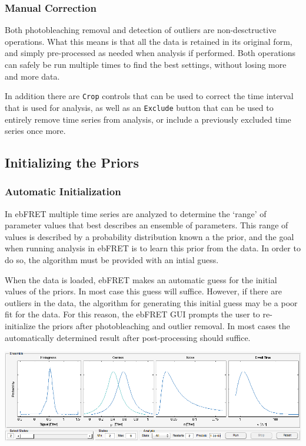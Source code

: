 \documentclass[12pt,article,oldfontcommands]{memoir}
\newcommand{\indt}{\qquad}
\begin{document}
\subsubsection{Manual Correction}

Both photobleaching removal and detection of outliers are non-desctructive operations. What this means is that all the data is retained in its original form, and simply pre-processed as needed when analysis if performed. Both operations can safely be run multiple times to find the best settings, without losing more and more data. 

In addition there are \texttt{Crop} controls that can be used to correct the time interval that is used for analysis, as well as an \texttt{Exclude} button that can be used to entirely remove time series from analysis, or include a previously excluded time series once more.

\subsection{Initializing the Priors}

\subsubsection{Automatic Initialization}

In ebFRET multiple time series are analyzed to determine the `range' of parameter values that best describes an ensemble of parameters. This range of values is described by a probability distribution known a the prior, and the goal when running analysis in ebFRET is to learn this prior from the data. In order to do so, the algorithm must be provided with an intial guess.

When the data is loaded, ebFRET makes an automatic guess for the initial values of the priors. In most case this guess will suffice. However, if there are outliers in the data, the algorithm for generating this initial guess may be a poor fit for the data. For this reason, the ebFRET GUI prompts the user to re-initialize the priors after photobleaching and outlier removal. In most cases the automatically determined result after post-processing should suffice.

\indt\includegraphics[width=5.5in]{images/ensemble_view}
\end{document}
